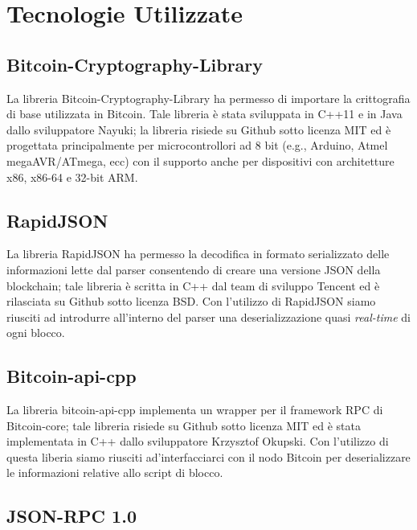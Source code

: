 \chapter{Tecnologie Utilizzate}\label{chap:tecnologieUtilizzate}

\section{Bitcoin-Cryptography-Library} \label{sec:cryptographyBitcoinLib}

La libreria Bitcoin-Cryptography-Library \cite{Bitcoin-Cryptography-Library:github} ha permesso di importare la crittografia di base utilizzata in Bitcoin. Tale  libreria è stata sviluppata in C++11 e in Java dallo sviluppatore Nayuki; la libreria risiede su Github sotto licenza MIT ed è progettata principalmente per microcontrollori ad 8 bit (e.g., Arduino, Atmel megaAVR/ATmega, ecc) con il supporto anche per dispositivi con architetture x86, x86-64 e 32-bit ARM.

\section{RapidJSON} \label{sec:rapidjsonLib}

La libreria RapidJSON \cite{rapidjson:github} ha permesso la decodifica in formato serializzato delle informazioni lette dal parser consentendo di creare una versione JSON della blockchain; tale libreria è scritta in C++ dal team di sviluppo Tencent ed è rilasciata su Github sotto licenza BSD.
Con l’utilizzo di RapidJSON siamo riusciti ad introdurre all’interno del parser una deserializzazione quasi \emph{real-time} di ogni blocco.


\section{Bitcoin-api-cpp} \label{sec:bitcoinApiLib}

La libreria bitcoin-api-cpp \cite{bitcoin-api-cpp:github} implementa un wrapper per il framework RPC di Bitcoin-core; tale libreria risiede su Github sotto licenza MIT ed è stata  implementata in C++ dallo sviluppatore Krzysztof Okupski.
Con l'utilizzo di questa liberia siamo riusciti ad'interfacciarci con il nodo Bitcoin per deserializzare le informazioni relative allo script di blocco.

\section{JSON-RPC 1.0} \label{sec:jsonrpchttp}

